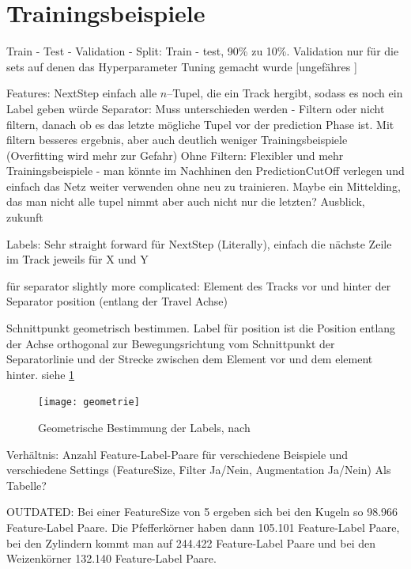 \section{Trainingsbeispiele}

Train - Test - Validation - Split:
Train - test, 90\% zu 10\%.
Validation nur für die sets auf denen das Hyperparameter Tuning gemacht wurde
[ungefähres ]


Features:
NextStep einfach alle \(n\)--Tupel, die ein Track hergibt, sodass es noch ein Label geben würde
Separator: Muss unterschieden werden - Filtern oder nicht filtern, danach ob es das letzte mögliche Tupel vor der prediction Phase ist.
Mit filtern besseres ergebnis, aber auch deutlich weniger Trainingsbeispiele (Overfitting wird mehr zur Gefahr)
Ohne Filtern: Flexibler und mehr Trainingsbeispiele - man könnte im Nachhinen den PredictionCutOff verlegen 
und einfach das Netz weiter verwenden ohne neu zu trainieren.
Maybe ein Mittelding, das man nicht alle tupel nimmt aber auch nicht nur die letzten? Ausblick, zukunft


Labels:
Sehr straight forward für NextStep (Literally), einfach die nächste Zeile im Track jeweils für X und Y

für separator slightly more complicated: 
Element des Tracks vor und hinter der Separator position (entlang der Travel Achse)

Schnittpunkt geometrisch bestimmen.
Label für position ist die Position entlang der Achse orthogonal zur Bewegungsrichtung vom Schnittpunkt der Separatorlinie und 
der Strecke zwischen dem Element vor und dem element hinter. siehe \ref{fig:Schnittpunkt}


\begin{figure}
	\centering
	\texttt{[image: geometrie]}
	\caption{Geometrische Bestimmung der Labels, nach \cite{Pfaff2018}}
	\label{fig:Schnittpunkt}
\end{figure}


Verhältnis: Anzahl Feature-Label-Paare für verschiedene Beispiele und verschiedene Settings
(FeatureSize, Filter Ja/Nein, Augmentation Ja/Nein) Als Tabelle?

OUTDATED:
Bei einer FeatureSize von 5 ergeben sich bei den Kugeln so 98.966 Feature-Label Paare.
Die Pfefferkörner haben dann 105.101 Feature-Label Paare,
bei den Zylindern kommt man auf 244.422 Feature-Label Paare
und bei den Weizenkörner 132.140 Feature-Label Paare.
